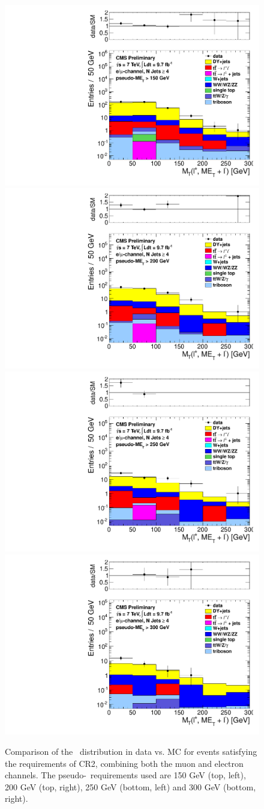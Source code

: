 \begin{figure}[hbt]
  \begin{center}
	\includegraphics[width=0.5\linewidth]{plots/CR2plots/mt_lepcor_scaled_met150_nj4_emucomb.pdf}%
	\includegraphics[width=0.5\linewidth]{plots/CR2plots/mt_lepcor_scaled_met200_nj4_emucomb.pdf}
	\includegraphics[width=0.5\linewidth]{plots/CR2plots/mt_lepcor_scaled_met250_nj4_emucomb.pdf}%
	\includegraphics[width=0.5\linewidth]{plots/CR2plots/mt_lepcor_scaled_met300_nj4_emucomb.pdf}
    \caption{
      Comparison of the \mt\ distribution in data vs. MC for events
      satisfying the requirements of CR2, combining both the muon and
      electron channels. The pseudo-\met\ requirements used are
      150 GeV (top, left), 200 GeV (top, right), 250 GeV (bottom,
      left) and 300 GeV (bottom, right).
\label{fig:cr2mtrest} 
}  
      \end{center}
\end{figure}
\clearpage
